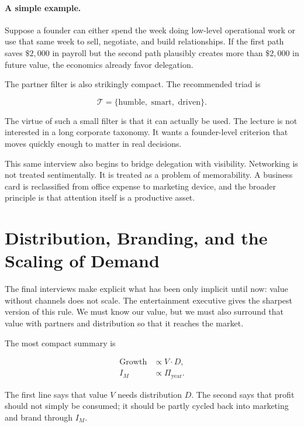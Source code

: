 \paragraph{A simple example.}
Suppose a founder can either spend the week doing low-level operational work or use that same week to sell, negotiate, and build relationships. If the first path saves \(\$2{,}000\) in payroll but the second path plausibly creates more than \(\$2{,}000\) in future value, the economics already favor delegation.

The partner filter is also strikingly compact. The recommended triad is

\begin{equation}
\mathcal{T}=\{\mbox{humble},\mbox{ smart},\mbox{ driven}\}.
\end{equation}

The virtue of such a small filter is that it can actually be used. The lecture is not interested in a long corporate taxonomy. It wants a founder-level criterion that moves quickly enough to matter in real decisions.

This same interview also begins to bridge delegation with visibility. Networking is not treated sentimentally. It is treated as a problem of memorability. A business card is reclassified from office expense to marketing device, and the broader principle is that attention itself is a productive asset.

\section{Distribution, Branding, and the Scaling of Demand}

The final interviews make explicit what has been only implicit until now: value without channels does not scale. The entertainment executive gives the sharpest version of this rule. We must know our value, but we must also surround that value with partners and distribution so that it reaches the market.

The most compact summary is

\begin{align}
\mathrm{Growth} &\propto V\cdot D,\\
I_M &\propto \Pi_{\mathrm{year}}.
\end{align}

The first line says that value \(V\) needs distribution \(D\). The second says that profit should not simply be consumed; it should be partly cycled back into marketing and brand through \(I_M\).

